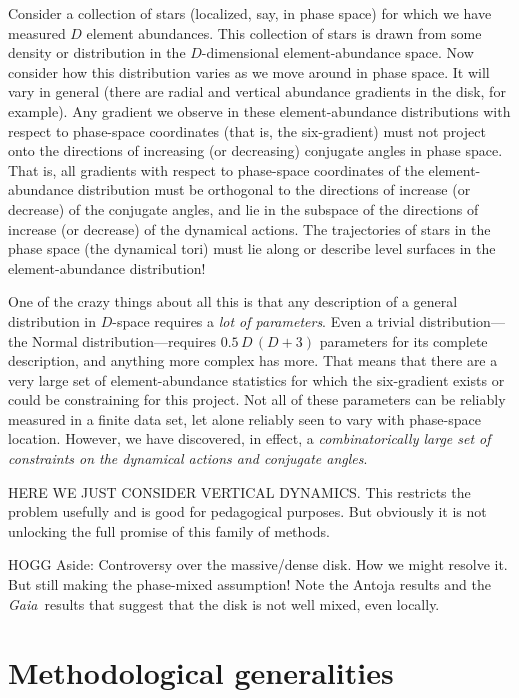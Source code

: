 \documentclass[modern]{aastex63}
\newcommand{\gaia}{\textsl{Gaia}}
\begin{document}
Consider a collection of stars (localized, say, in phase space) for which we have
measured $D$ element abundances.
This collection of stars is drawn from some density or distribution in
the $D$-dimensional element-abundance space.
Now consider how this distribution varies as we move around in phase space.
It will vary in general (there are radial and vertical abundance gradients in the
disk, for example).
Any gradient we observe in these element-abundance distributions with respect to
phase-space coordinates (that is, the six-gradient) must not project
onto the directions of increasing (or decreasing) conjugate angles in phase space.
That is, all gradients with respect to phase-space coordinates
of the element-abundance distribution must be orthogonal to the
directions of increase (or decrease) of the conjugate angles, and lie in the subspace
of the directions of increase (or decrease) of the dynamical actions.
The trajectories of stars in the phase space (the dynamical tori) must lie along or
describe level surfaces in the element-abundance distribution!

One of the crazy things about all this is that any description of a general distribution in $D$-space
requires a \emph{lot of parameters}.
Even a trivial distribution---the Normal distribution---requires $0.5\,D\,(D+3)$ parameters for its
complete description, and anything more complex has more.
That means that there are a very large set of element-abundance statistics for which the
six-gradient exists or could be constraining for this project.
Not all of these parameters can be reliably measured in a finite data set,
let alone reliably seen to vary with phase-space location.
However,
we have discovered, in effect, a \emph{combinatorically large set of constraints on the
dynamical actions and conjugate angles}.

HERE WE JUST CONSIDER VERTICAL DYNAMICS.
This restricts the problem usefully and is good for pedagogical purposes.
But obviously it is not unlocking the full promise of this family of methods.

HOGG Aside: Controversy over the massive/dense disk. How we might resolve it.
But still making the phase-mixed assumption! Note the Antoja results and the \gaia\ results
that suggest that the disk is not well mixed, even locally.

\section{Methodological generalities}
\end{document}
